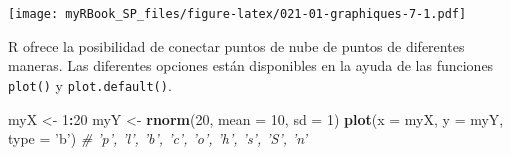 \documentclass[
]{book}
\newenvironment{Shaded}{\begin{snugshade}}{\end{snugshade}}
\newcommand{\CommentTok}[1]{\textcolor[rgb]{0.56,0.35,0.01}{\textit{#1}}}
\newcommand{\DataTypeTok}[1]{\textcolor[rgb]{0.13,0.29,0.53}{#1}}
\newcommand{\DecValTok}[1]{\textcolor[rgb]{0.00,0.00,0.81}{#1}}
\newcommand{\FloatTok}[1]{\textcolor[rgb]{0.00,0.00,0.81}{#1}}
\newcommand{\KeywordTok}[1]{\textcolor[rgb]{0.13,0.29,0.53}{\textbf{#1}}}
\newcommand{\NormalTok}[1]{#1}
\newcommand{\OperatorTok}[1]{\textcolor[rgb]{0.81,0.36,0.00}{\textbf{#1}}}
\newcommand{\StringTok}[1]{\textcolor[rgb]{0.31,0.60,0.02}{#1}}
\begin{document}
\begin{Shaded}
\end{Shaded}

\texttt{[image: myRBook\_SP\_files/figure-latex/021-01-graphiques-7-1.pdf]}

R ofrece la posibilidad de conectar puntos de nube de puntos de diferentes maneras. Las diferentes opciones están disponibles en la ayuda de las funciones \texttt{plot()} y \texttt{plot.default()}.

\begin{Shaded}
\begin{Highlighting}[]
\NormalTok{myX <-}\StringTok{ }\DecValTok{1}\OperatorTok{:}\DecValTok{20}
\NormalTok{myY <-}\StringTok{ }\KeywordTok{rnorm}\NormalTok{(}\DecValTok{20}\NormalTok{, }\DataTypeTok{mean =} \DecValTok{10}\NormalTok{, }\DataTypeTok{sd =} \DecValTok{1}\NormalTok{)}
\KeywordTok{plot}\NormalTok{(}\DataTypeTok{x =}\NormalTok{ myX, }\DataTypeTok{y =}\NormalTok{ myY, }
  \DataTypeTok{type =} \StringTok{'b'}\NormalTok{) }\CommentTok{# 'p', 'l', 'b', 'c', 'o', 'h', 's', 'S', 'n'}
\end{Highlighting}
\end{Shaded}
\end{document}
